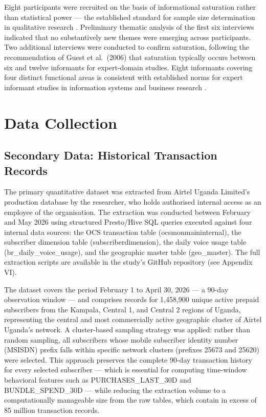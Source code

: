 Eight participants were recruited on the basis of informational saturation rather
than statistical power --- the established standard for sample size determination
in qualitative research \cite{ref23, ref_mason}. Preliminary thematic analysis of
the first six interviews indicated that no substantively new themes were emerging
across participants. Two additional interviews were conducted to confirm saturation,
following the recommendation of Guest et al.\ (2006) \cite{ref23} that saturation
typically occurs between six and twelve informants for expert-domain studies. Eight
informants covering four distinct functional areas is consistent with established
norms for expert informant studies in information systems and business research
\cite{ref_myers, ref41}.

\section{Data Collection}


\subsection{Secondary Data: Historical Transaction Records}

The primary quantitative dataset was extracted from Airtel Uganda Limited's production database by the researcher, who holds authorised internal access as an employee of the organisation. The extraction was conducted between February and May 2026 using structured Presto/Hive SQL queries executed against four internal data sources: the OCS transaction table (ocsmonmaininternal), the subscriber dimension table (subscriberdimension), the daily voice usage table (br\_daily\_voice\_usage), and the geographic master table (geo\_master). The full extraction scripts are available in the study's GitHub repository (see Appendix VI).

The dataset covers the period February 1 to April 30, 2026 --- a 90-day observation window --- and comprises records for 1,458,900 unique active prepaid subscribers from the Kampala, Central 1, and Central 2 regions of Uganda, representing the central and most commercially active geographic cluster of Airtel Uganda's network. A cluster-based sampling strategy was applied: rather than random sampling, all subscribers whose mobile subscriber identity number (MSISDN) prefix falls within specific network clusters (prefixes 25673 and 25620) were selected. This approach preserves the complete 90-day transaction history for every selected subscriber --- which is essential for computing time-window behavioral features such as PURCHASES\_LAST\_30D and BUNDLE\_SPEND\_30D --- while reducing the extraction volume to a computationally manageable size from the raw tables, which contain in excess of 85 million transaction records.

